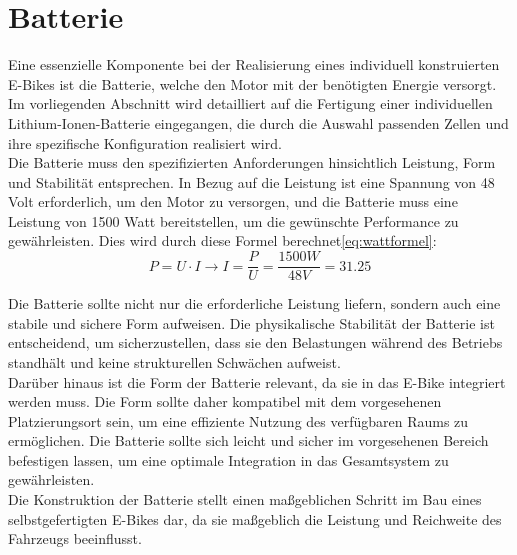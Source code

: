 
\chapter{Batterie}\label{introduction}
Eine essenzielle Komponente bei der Realisierung eines individuell konstruierten E-Bikes ist die Batterie, welche den Motor mit der benötigten Energie versorgt. Im vorliegenden Abschnitt wird detailliert auf die Fertigung einer individuellen Lithium-Ionen-Batterie eingegangen, die durch die Auswahl passenden Zellen und ihre spezifische Konfiguration realisiert wird.\\

Die Batterie muss den spezifizierten Anforderungen hinsichtlich Leistung, Form und Stabilität entsprechen. In Bezug auf die Leistung ist eine Spannung von 48 Volt erforderlich, um den Motor zu versorgen, und die Batterie muss eine Leistung von 1500 Watt bereitstellen, um die gewünschte Performance zu gewährleisten. Dies wird durch diese Formel berechnet\ref*{eq:wattformel}:\\
\begin{equation}
    P = U \cdot I \longrightarrow I = \frac{P}{U}= \frac{1500W}{48V}= 31.25
    \label{eq:wattformel}
\end{equation}
\label{introduction2}

Die Batterie sollte nicht nur die erforderliche Leistung liefern, sondern auch eine stabile und sichere Form aufweisen. Die physikalische Stabilität der Batterie ist entscheidend, um sicherzustellen, dass sie den Belastungen während des Betriebs standhält und keine strukturellen Schwächen aufweist.\\

Darüber hinaus ist die Form der Batterie relevant, da sie in das E-Bike integriert werden muss. Die Form sollte daher kompatibel mit dem vorgesehenen Platzierungsort sein, um eine effiziente Nutzung des verfügbaren Raums zu ermöglichen. Die Batterie sollte sich leicht und sicher im vorgesehenen Bereich befestigen lassen, um eine optimale Integration in das Gesamtsystem zu gewährleisten.\\

Die Konstruktion der Batterie stellt einen maßgeblichen Schritt im Bau eines selbstgefertigten E-Bikes dar, da sie maßgeblich die Leistung und Reichweite des Fahrzeugs beeinflusst.



